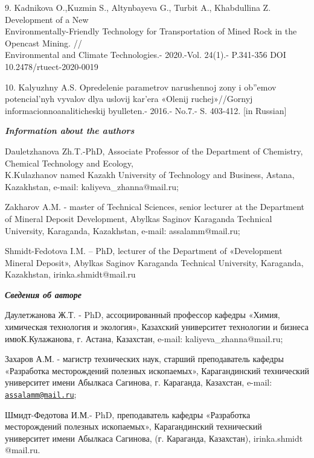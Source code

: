 \begin{references}
9. Kadnikova O.,Kuzmin S., Altynbayeva G., Turbit A., Khabdullina Z.
Development of a New \\Environmentally-Friendly Technology for
Transportation of Mined Rock in the Opencast Mining. // \\Environmental
and Climate Technologies.- 2020.-Vol. 24(1).- P.341-356 DOI
10.2478/rtuect-2020-0019

10. Kalyuzhny A.S. Opredelenie parametrov narushennoj zony i ob''emov
potencial'nyh vyvalov dlya uslovij kar'era «Olenij ruchej»//Gornyj
informacionnoanaliticheskij byulleten.- 2016.- No.7.- S. 403-412. {[}in
Russian{]}
\end{references}

\begin{authorinfo}
\emph{{\bfseries Information about the authors}}

Dauletzhanova Zh.T.-PhD, Associate Professor of the Department of
Chemistry, Chemical Technology and Ecology, \\K.Kulazhanov named Kazakh
University of Technology and Business, Astana, Kazakhstan, e-mail:
kaliyeva\_zhanna@mail.ru;

Zakharov A.M. - master of Technical Sciences, senior lecturer at the
Department of Mineral Deposit Development, Abylkas Saginov Karaganda
Technical University, Karaganda, Kazakhstan, e-mail: assalamm@mail.ru;

Shmidt-Fedotova I.M. -- PhD, lecturer of the Department of «Development
Mineral Deposit», Abylkas Saginov Karaganda Technical University,
Karaganda, Kazakhstan, irinka.shmidt@mail.ru

\emph{{\bfseries Сведения об авторе}}

Даулетжанова Ж.Т. - PhD, ассоциированный профессор кафедры «Химия,
химическая технология и экология», Казахский университет технологии и
бизнеса имюК.Кулажанова, г. Астана, Казахстан, e-mail:
kaliyeva\_zhanna@mail.ru;

Захаров А.М. - магистр технических наук, старший преподаватель кафедры
«Разработка месторождений полезных ископаемых», Карагандинский
технический университет имени Абылкаса Сагинова, г. Караганда,
Казахстан, e-mail:\\
\href{mailto:assalamm@mail.ru}{\nolinkurl{assalamm@mail.ru}};

Шмидт-Федотова И.М.- PhD, преподаватель кафедры «Разработка
месторождений полезных ископаемых», Карагандинский технический
университет имени Абылкаса Сагинова, (г. Караганда, Казахстан),
irinka.shmidt @mail.ru.
\end{authorinfo}
